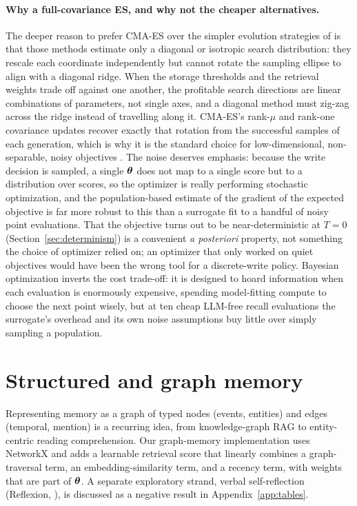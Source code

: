 \paragraph{Why a full-covariance ES, and why not the cheaper alternatives.}
The deeper reason to prefer CMA-ES over the simpler evolution strategies of
\citet{salimans2017es} is that those methods estimate only a diagonal or
isotropic search distribution: they rescale each coordinate independently but
cannot rotate the sampling ellipse to align with a diagonal ridge. When the
storage thresholds and the retrieval weights trade off against one another, the
profitable search directions are linear combinations of parameters, not single
axes, and a diagonal method must zig-zag across the ridge instead of travelling
along it. CMA-ES's rank-$\mu$ and rank-one covariance updates recover exactly
that rotation from the successful samples of each generation, which is why it is
the standard choice for low-dimensional, non-separable, noisy objectives
\citep{hansen2016cmaes}. The noise deserves emphasis: because the write decision
is sampled, a single $\boldsymbol{\theta}$ does not map to a single score but to a
distribution over scores, so the optimizer is really performing stochastic
optimization, and the population-based estimate of the gradient of the
expected objective is far more robust to this than a surrogate fit to a
handful of noisy point evaluations. That the objective turns out to be
near-deterministic at $T{=}0$ (Section~\ref{sec:determinism}) is a convenient
\emph{a posteriori} property, not something the choice of optimizer relied on;
an optimizer that only worked on quiet objectives would have been the wrong
tool for a discrete-write policy. Bayesian optimization \citep{snoek2012bayesopt}
inverts the cost trade-off: it is designed to hoard information when each
evaluation is enormously expensive, spending model-fitting compute to choose the
next point wisely, but at ten cheap LLM-free recall evaluations the surrogate's
overhead and its own noise assumptions buy little over simply sampling a
population.

\section{Structured and graph memory}
Representing memory as a graph of typed nodes (events, entities) and edges
(temporal, mention) is a recurring idea, from knowledge-graph RAG
\citep{gutierrez2024hipporag} to entity-centric reading comprehension. Our
graph-memory implementation uses NetworkX \citep{hagberg2008networkx} and adds a
learnable retrieval score that linearly combines a graph-traversal term, an
embedding-similarity term, and a recency term, with weights that are part of
$\boldsymbol{\theta}$. A separate exploratory strand, verbal self-reflection
(Reflexion, \citealp{shinn2023reflexion}), is discussed as a negative result in
Appendix~\ref{app:tables}.


